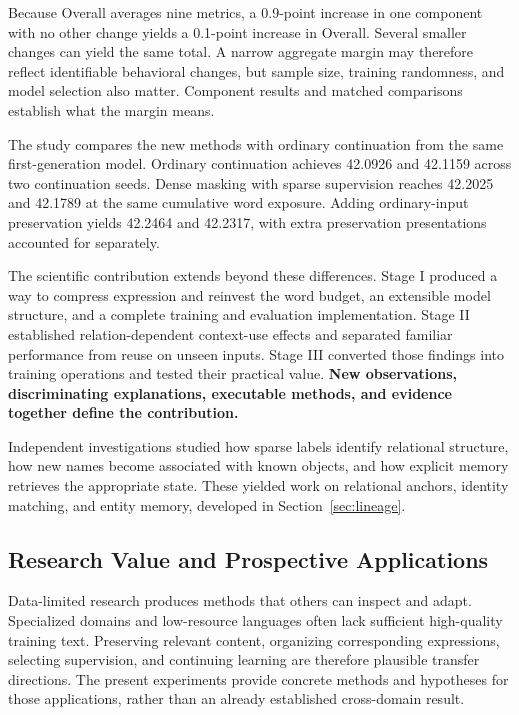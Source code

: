 Because Overall averages nine metrics, a 0.9-point increase in one component with no other change yields a 0.1-point increase in Overall. Several smaller changes can yield the same total. A narrow aggregate margin may therefore reflect identifiable behavioral changes, but sample size, training randomness, and model selection also matter. Component results and matched comparisons establish what the margin means.

The study compares the new methods with ordinary continuation from the same first-generation model. Ordinary continuation achieves 42.0926 and 42.1159 across two continuation seeds. Dense masking with sparse supervision reaches 42.2025 and 42.1789 at the same cumulative word exposure. Adding ordinary-input preservation yields 42.2464 and 42.2317, with extra preservation presentations accounted for separately.

The scientific contribution extends beyond these differences. Stage I produced a way to compress expression and reinvest the word budget, an extensible model structure, and a complete training and evaluation implementation. Stage II established relation-dependent context-use effects and separated familiar performance from reuse on unseen inputs. Stage III converted those findings into training operations and tested their practical value. \textbf{New observations, discriminating explanations, executable methods, and evidence together define the contribution.}

Independent investigations studied how sparse labels identify relational structure, how new names become associated with known objects, and how explicit memory retrieves the appropriate state. These yielded work on relational anchors, identity matching, and entity memory, developed in Section~\ref{sec:lineage}.

\subsection{Research Value and Prospective Applications}

Data-limited research produces methods that others can inspect and adapt. Specialized domains and low-resource languages often lack sufficient high-quality training text. Preserving relevant content, organizing corresponding expressions, selecting supervision, and continuing learning are therefore plausible transfer directions. The present experiments provide concrete methods and hypotheses for those applications, rather than an already established cross-domain result.

